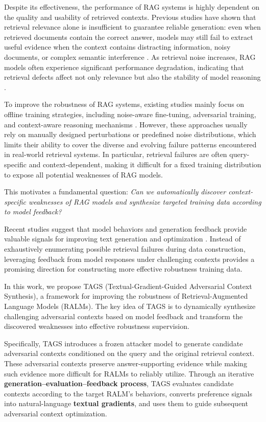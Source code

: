 \documentclass[11pt]{article}
\begin{document}
Despite its effectiveness, the performance of RAG systems is highly dependent on the quality and usability of retrieved contexts. 
Previous studies have shown that retrieval relevance alone is insufficient to guarantee reliable generation: even when retrieved documents contain the correct answer, models may still fail to extract useful evidence when the context contains distracting information, noisy documents, or complex semantic interference \cite{shi2023large,yoran2023making}. 
As retrieval noise increases, RAG models often experience significant performance degradation, indicating that retrieval defects affect not only relevance but also the stability of model reasoning \cite{cuconasu2024power,amiraz-etal-2025-distracting}.


To improve the robustness of RAG systems, existing studies mainly focus on offline training strategies, including noise-aware fine-tuning, adversarial training, and context-aware reasoning mechanisms \cite{RbFT,RAAT,ATM,CoN}. 
However, these approaches usually rely on manually designed perturbations or predefined noise distributions, which limits their ability to cover the diverse and evolving failure patterns encountered in real-world retrieval systems. 
In particular, retrieval failures are often query-specific and context-dependent, making it difficult for a fixed training distribution to expose all potential weaknesses of RAG models.


This motivates a fundamental question:
\textit{Can we automatically discover context-specific weaknesses of RAG models and synthesize targeted training data according to model feedback?}


Recent studies suggest that model behaviors and generation feedback provide valuable signals for improving text generation and optimization \cite{textgrad,tpo}. 
Instead of exhaustively enumerating possible retrieval failures during data construction, leveraging feedback from model responses under challenging contexts provides a promising direction for constructing more effective robustness training data.


In this work, we propose TAGS (Textual-Gradient-Guided Adversarial Context Synthesis), a framework for improving the robustness of Retrieval-Augmented Language Models (RALMs). 
The key idea of TAGS is to dynamically synthesize challenging adversarial contexts based on model feedback and transform the discovered weaknesses into effective robustness supervision.


Specifically, TAGS introduces a frozen attacker model to generate candidate adversarial contexts conditioned on the query and the original retrieval context. 
These adversarial contexts preserve answer-supporting evidence while making such evidence more difficult for RALMs to reliably utilize. 
Through an iterative \textbf{generation--evaluation--feedback process}, TAGS evaluates candidate contexts according to the target RALM's behaviors, converts preference signals into natural-language \textbf{textual gradients}, and uses them to guide subsequent adversarial context optimization.
\end{document}
